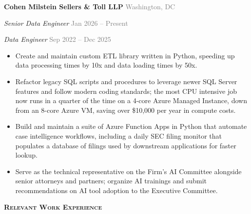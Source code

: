 \documentclass[12pt]{article}
\begin{document}
\begin{small}
  
  \textbf{Cohen Milstein Sellers \& Toll LLP} \hfill \textcolor{gray}{Washington, DC}
  
  \textit{Senior Data Engineer} \hfill 
  \textcolor{gray}{Jan 2026 -- Present}
  
  
  \textit{Data Engineer} \hfill 
  \textcolor{gray}{Sep 2022 -- Dec 2025}
  
  
  \vspace{-2mm}

  \begin{itemize}[leftmargin=0.5cm]
      \setlength\itemsep{-1mm}
      
    \item Create and maintain custom ETL library written in Python, speeding up data processing times by 10x and data loading times by 50x.
      
    \item Refactor legacy SQL scripts and procedures to leverage newer SQL Server features and follow modern coding standards; the most CPU intensive job now runs in a quarter of the time on a 4-core Azure Managed Instance, down from an 8-core Azure VM, saving over \$10,000 per year in compute costs.
      
    \item Build and maintain a suite of Azure Function Apps in Python that automate case intelligence workflows, including a daily SEC filing monitor that populates a database of filings used by downstream applications for faster lookup.
      
    \item Serve as the technical representative on the Firm's AI Committee alongside senior attorneys and partners; organize AI trainings and submit recommendations on AI tool adoption to the Executive Committee.
      
  \end{itemize}
  \vspace{-2mm}
  
\end{small}
\vspace{-2mm}




\hrulefill

\begin{large}
  \textsc{\textbf{Relevant Work Experience}}
  \vspace{-3mm}
\end{large}
\end{document}
